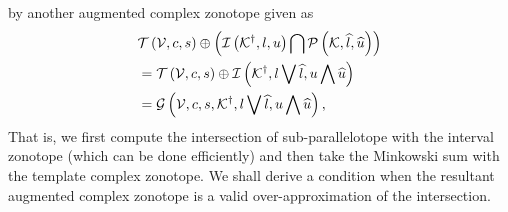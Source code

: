 %
by another augmented complex zonotope given as
%
\begin{align*}
& \mathit{\operatorname{\mathcal{T}}}\left(\mathcal{V},c,s\right)\oplus \left(\mathit{\operatorname{\mathcal{I}}}\left({\mathcal{K}}^\dagger,l,u\right)\bigcap \mathcal{P}\left(\mathcal{K},\widehat{l},\widehat{u}\right)\right)\\
& =
  \mathit{\operatorname{\mathcal{T}}}\left(\mathcal{V},c,s\right)\oplus \mathit{\operatorname{\mathcal{I}}}\left({\mathcal{K}}^\dagger,l\bigvee \widehat{l},u\bigwedge \widehat{u}\right)\\
& = \mathcal{G}\left(\mathcal{V},c,s,{\mathcal{K}}^\dagger,l\bigvee \widehat{l},u\bigwedge \widehat{u}\right),
\end{align*}
%
That is, we first compute the intersection of
sub-parallelotope with the interval zonotope (which can be done
efficiently) and then take the Minkowski sum with the template complex
zonotope.  We shall derive a condition when the resultant augmented
complex zonotope is a valid over-approximation of the intersection.

